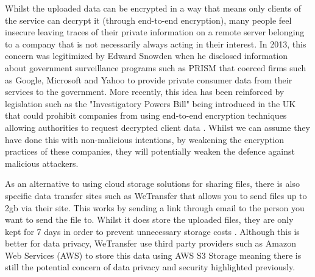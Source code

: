 \documentclass[]{report}
\begin{document}
		 	Whilst the uploaded data can be encrypted in a way that means only clients of the service can decrypt it (through end-to-end encryption), many people feel insecure leaving traces of their private information on a remote server belonging to a company that is not necessarily always acting in their interest. In 2013, this concern was legitimized by Edward Snowden when he disclosed information about government surveillance programs such as PRISM that coerced firms such as Google, Microsoft and Yahoo to provide private consumer data from their services to the government.\cite{PRISM}  More recently, this idea has been reinforced by legislation such as the "Investigatory Powers Bill" being introduced in the UK that could prohibit companies from using end-to-end encryption techniques allowing authorities to request decrypted client data \cite{IPB Encryption}. Whilst we can assume they have done this with non-malicious intentions, by weakening the encryption practices of these companies, they will potentially weaken the defence against malicious attackers.
			
			As an alternative to using cloud storage solutions for sharing files, there is also specific data transfer sites such as WeTransfer that allows you to send files up to 2gb via their site. This works by sending a link through email to the person you want to send the file to. Whilst it does store the uploaded files, they are only kept for 7 days in order to prevent unnecessary storage costs \cite{WeTransfer Storage Time}. Although this is better for data privacy, WeTransfer use third party providers such as Amazon Web Services (AWS) to store this data using AWS S3 Storage \cite{WeTransfer AWS Case Study} meaning there is still the potential concern of data privacy and security highlighted previously.
			
\end{document}
